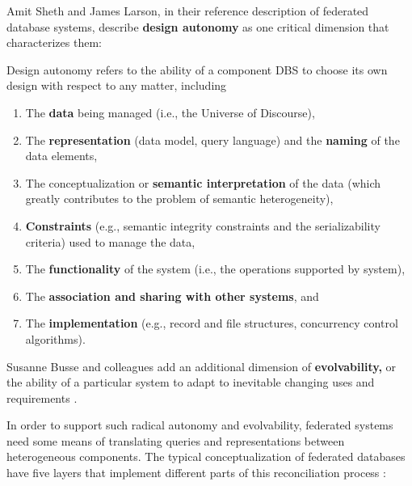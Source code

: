 \documentclass[10pt]{article}
\begin{document}
\begin{multicols}{2}
Amit Sheth and James Larson, in their reference description of federated
database systems, describe \textbf{design autonomy} as one critical
dimension that characterizes them:

\begin{leftbar}
Design autonomy refers to the ability of a component DBS to choose its
own design with respect to any matter, including

\begin{enumerate}
\def\labelenumi{(\alph{enumi})}
\item
  The \textbf{data} being managed (i.e., the Universe of Discourse),
\item
  The \textbf{representation} (data model, query language) and the
  \textbf{naming} of the data elements,
\item
  The conceptualization or \textbf{semantic interpretation} of the data
  (which greatly contributes to the problem of semantic heterogeneity),
\item
  \textbf{Constraints} (e.g., semantic integrity constraints and the
  serializability criteria) used to manage the data,
\item
  The \textbf{functionality} of the system (i.e., the operations
  supported by system),
\item
  The \textbf{association and sharing with other systems}, and
\item
  The \textbf{implementation} (e.g., record and file structures,
  concurrency control algorithms).
\end{enumerate}
\end{leftbar}

Susanne Busse and colleagues add an additional dimension of
\textbf{evolvability,} or the ability of a particular system to adapt to
inevitable changing uses and requirements \cite{busseFederatedInformationSystems1999} .

In order to support such radical autonomy and evolvability, federated
systems need some means of translating queries and representations
between heterogeneous components. The typical conceptualization of
federated databases have five layers that implement different parts of
this reconciliation process \cite{shethFederatedDatabaseSystems1990} :

\begin{itemize}


\end{itemize}
\end{multicols}
\end{document}
